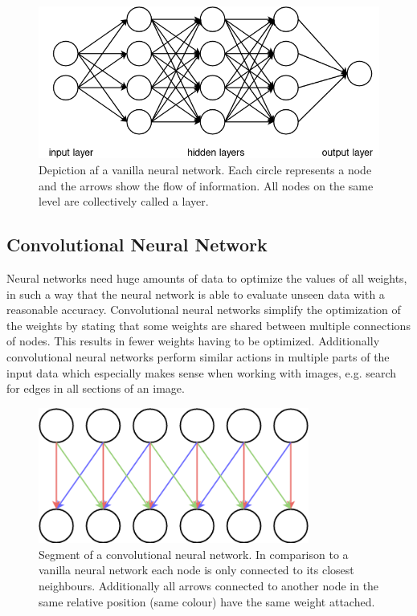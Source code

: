 \begin{figure}[h!]
	\centering
	\includegraphics[width=4.5in]{img/methodology_neuralNetwork_visualizationOfANN.png}
	\caption{Depiction af a vanilla neural network. Each circle represents a node and the arrows show the flow of information. All nodes on the same level are collectively called a layer.}
	\label{pic:methodology_neuralNetwork_visualizationOfANN}
\end{figure}

\subsection{Convolutional Neural Network}
\label{sec:convolutional_nn}
Neural networks need huge amounts of data to optimize the values of all weights, in such a way that the neural network is able to evaluate unseen data with a reasonable accuracy. Convolutional neural networks simplify the optimization of the weights by stating that some weights are shared between multiple connections of nodes. This results in fewer weights having to be optimized. Additionally convolutional neural networks perform similar actions in multiple parts of the input data which especially makes sense when working with images, e.g. search for edges in all sections of an image.

\begin{figure}[h!]
	\centering
	\includegraphics[width=3.5in]{img/methodology_neuralNetwork_visualizationOfACNN.png}
	\caption{Segment of a convolutional neural network. In comparison to a vanilla neural network each node is only connected to its closest neighbours. Additionally all arrows connected to another node in the same relative position (same colour) have the same weight attached.}
	\label{pic:methodology_neuralNetwork_visualizationOfACNN}
\end{figure}

